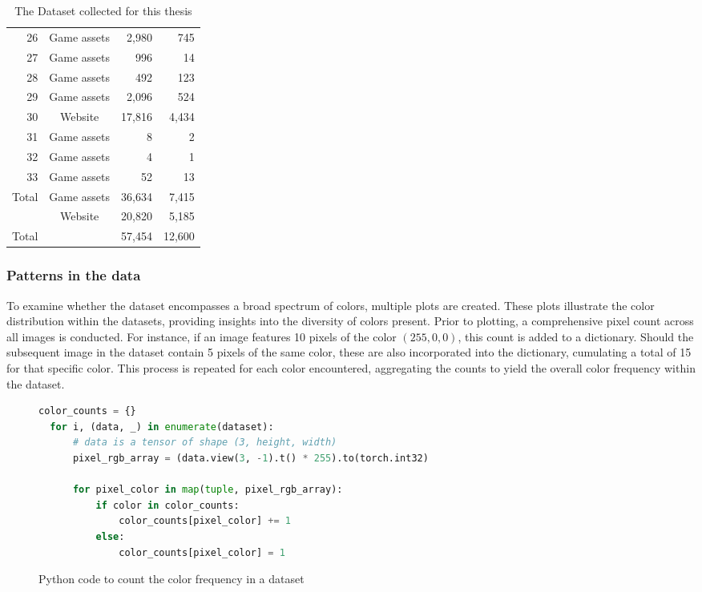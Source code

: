 \begin{table}[H]
\begin{adjustbox}{width=0.8\textwidth}
\begin{tabular}{|r|c|r|r|}
              26 & Game assets & 2,980 & 745 \\
              27 & Game assets & 996 & 14 \\
              28 & Game assets & 492 & 123 \\
              29 & Game assets & 2,096 & 524 \\
              30 & Website & 17,816 & 4,434 \\
              31 & Game assets & 8 & 2 \\
              32 & Game assets & 4 & 1 \\
              33 & Game assets & 52 & 13 \\
              \hline
              Total & Game assets & 36,634 & 7,415 \\
                    & Website & 20,820 & 5,185 \\
              \hline
              Total & & 57,454 & 12,600 \\
              \hline
          \end{tabular}
        \end{adjustbox}
        \caption{The Dataset collected for this thesis}
        \label{tab:datasets}
    \end{table}

    \subsubsection{Patterns in the data}
    
    To examine whether the dataset encompasses a broad spectrum of colors, multiple plots are created. These plots illustrate the color distribution within the datasets, providing insights into the diversity of colors present. Prior to plotting, a comprehensive pixel count across all images is conducted. For instance, if an image features 10 pixels of the color $(255, 0, 0)$, this count is added to a dictionary. Should the subsequent image in the dataset contain 5 pixels of the same color, these are also incorporated into the dictionary, cumulating a total of 15 for that specific color. This process is repeated for each color encountered, aggregating the counts to yield the overall color frequency within the dataset.

\begin{figure}[H]
\centering
\begin{lstlisting}[language=Python]
  color_counts = {} 
  for i, (data, _) in enumerate(dataset):
      # data is a tensor of shape (3, height, width) 
      pixel_rgb_array = (data.view(3, -1).t() * 255).to(torch.int32)
      
      for pixel_color in map(tuple, pixel_rgb_array):
          if color in color_counts:
              color_counts[pixel_color] += 1
          else:
              color_counts[pixel_color] = 1
\end{lstlisting}
\caption{Python code to count the color frequency in a dataset}
\label{fig:color_count}
\end{figure}

